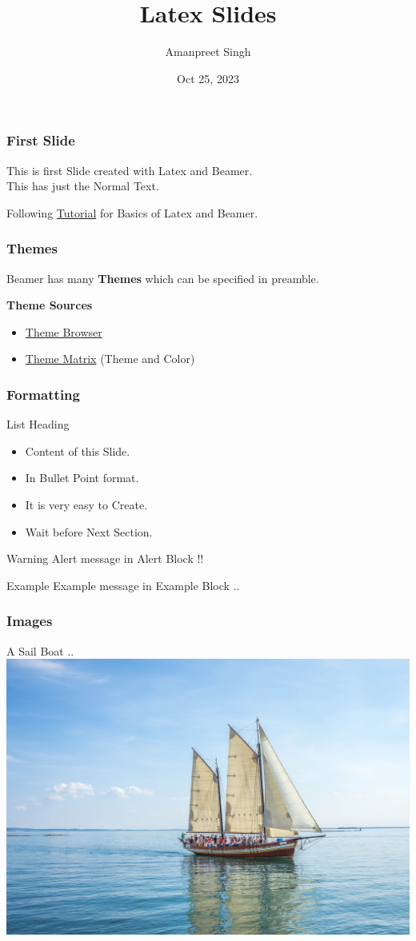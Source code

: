 \documentclass{beamer}
\title{Latex Slides}
\author{Amanpreet Singh}
\date{Oct 25, 2023}
\begin{document}
\maketitle

\begin{frame}
\frametitle{First Slide}
This is first Slide created with Latex and Beamer.\\
This has just the Normal Text.

Following \href{https://latex-beamer.com/tutorials/beamer-themes/}{Tutorial} for Basics of Latex and Beamer.
\end{frame}

\begin{frame}
\frametitle{Themes}
Beamer has many \textbf{Themes} which can be specified in preamble.

\textbf{Theme Sources}
\begin{itemize}
    \item \href{https://deic.uab.cat/~iblanes/beamer_gallery/index_by_theme.html}{Theme Browser}
    \item \href{https://hartwork.org/beamer-theme-matrix/}{Theme Matrix} (Theme and Color)
\end{itemize}

\end{frame}

\begin{frame}
    \frametitle{Formatting}
    List Heading
    \begin{itemize}
        \item Content of this Slide.
        \item In Bullet Point format.
        \item It is very easy to Create.
        \item Wait before Next Section.\pause
    \end{itemize}

    \begin{alertblock}{Warning}
        Alert message in Alert Block !!
    \end{alertblock}

    \begin{exampleblock}{Example}
        Example message in Example Block ..
    \end{exampleblock}

\end{frame}

\begin{frame}
    \frametitle{Images}
    A Sail Boat ..
    \includegraphics[width=0.8\linewidth]{boat.jpg}
\end{frame}
\end{document}
